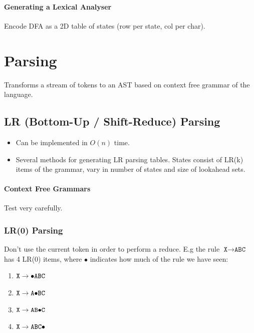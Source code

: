 \documentclass[twocolumn,english]{article}
\begin{document}
\paragraph{Generating a Lexical Analyser}

Encode DFA as a 2D table of states (row per state, col per char).

\section{Parsing}

Transforms a stream of tokens to an AST based on context free grammar
of the language.

\subsection{LR (Bottom-Up / Shift-Reduce) Parsing}
\begin{itemize}
\item Can be implemented in $O(n)$ time. 
\item Several methods for generating LR parsing tables. States consist of
LR(k) items of the grammar, vary in number of states and size of lookahead
sets. 
\end{itemize}

\paragraph{Context Free Grammars}

Test very carefully.

\subsubsection{LR(0) Parsing}

Don't use the current token in order to perform a reduce. E.g the
rule $\texttt{X}\rightarrow\texttt{ABC}$ has 4 LR(0) items, where
$\bullet$ indicates how much of the rule we have seen: 
\begin{enumerate}
\item $\texttt{X}\rightarrow\texttt{\ensuremath{\bullet}ABC}$ 
\item $\texttt{X}\rightarrow\texttt{A\ensuremath{\bullet}BC}$ 
\item $\texttt{X}\rightarrow\texttt{AB\ensuremath{\bullet}C}$ 
\item $\texttt{X}\rightarrow\texttt{ABC\ensuremath{\bullet}}$ 
\end{enumerate}
\end{document}
